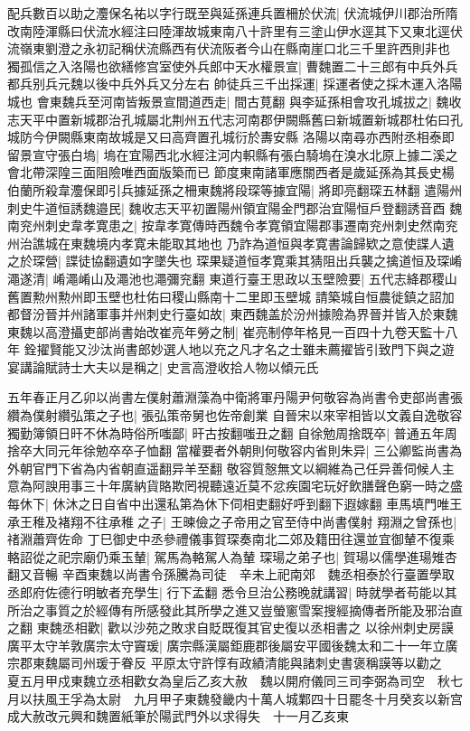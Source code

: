 配兵數百以助之灋保名祐以字行既至與延孫連兵置柵於伏流|{
	伏流城伊川郡治所隋改南陸渾縣曰伏流水經注曰陸渾故城東南八十許里有三塗山伊水逕其下又東北逕伏流嶺東劉澄之永初記稱伏流縣西有伏流阪者今山在縣南崖口北三千里許西則非也}
獨孤信之入洛陽也欲繕修宫室使外兵郎中天水權景宣|{
	曹魏置二十三郎有中兵外兵都兵别兵元魏以後中兵外兵又分左右}
帥徒兵三千出採運|{
	採運者使之採木運入洛陽城也}
會東魏兵至河南皆叛景宣間道西走|{
	間古莧翻}
與李延孫相會攻孔城拔之|{
	魏收志天平中置新城郡治孔城屬北荆州五代志河南郡伊闕縣舊曰新城置新城郡杜佑曰孔城防今伊闕縣東南故城是又曰高齊置孔城衍於夀安縣}
洛陽以南尋亦西附丞相泰即留景宣守張白塢|{
	塢在宜陽西北水經注河内軹縣有張白騎塢在溴水北原上據二溪之會北帶深隍三面阻險唯西面版築而已}
節度東南諸軍應關西者是歲延孫為其長史楊伯蘭所殺韋灋保即引兵據延孫之柵東魏將段琛等據宜陽|{
	將即亮翻琛五林翻}
遣陽州刺史牛道恒誘魏邉民|{
	魏收志天平初置陽州領宜陽金門郡治宜陽恒戶登翻誘音酉}
魏南兖州刺史韋孝寛患之|{
	按韋孝寛傳時西魏令孝寛領宜陽郡事遷南兖州刺史然南兖州治譙城在東魏境内孝寛未能取其地也}
乃詐為道恒與孝寛書論歸欵之意使諜人遺之於琛營|{
	諜徒協翻遺如字墜失也}
琛果疑道恒孝寛乘其猜阻出兵襲之擒道恒及琛崤澠遂清|{
	崤澠崤山及澠池也澠彌兖翻}
東道行臺王思政以玉壁險要|{
	五代志絳郡稷山舊置勲州勲州即玉壁也杜佑曰稷山縣南十二里即玉壁城}
請築城自恒農徙鎮之詔加都督汾晉并州諸軍事并州刺史行臺如故|{
	東西魏盖於汾州據險為界晉并皆入於東魏}
東魏以高澄攝吏部尚書始改崔亮年勞之制|{
	崔亮制停年格見一百四十九卷天監十八年}
銓擢賢能又沙汰尚書郎妙選人地以充之凡才名之士雖未薦擢皆引致門下與之遊宴講論賦詩士大夫以是稱之|{
	史言高澄收拾人物以傾元氏}


五年春正月乙卯以尚書左僕射蕭淵藻為中衛將軍丹陽尹何敬容為尚書令吏部尚書張纘為僕射纘弘策之子也|{
	張弘策帝舅也佐帝創業}
自晉宋以來宰相皆以文義自逸敬容獨勤簿領日旰不休為時俗所嗤鄙|{
	旰古按翻嗤丑之翻}
自徐勉周捨既卒|{
	普通五年周捨卒大同元年徐勉卒卒子恤翻}
當權要者外朝則何敬容内省則朱异|{
	三公卿監尚書為外朝官門下省為内省朝直遥翻异羊至翻}
敬容質慤無文以綱維為己任异善伺候人主意為阿諛用事三十年廣納貨賂欺罔視聽遠近莫不忿疾園宅玩好飲膳聲色窮一時之盛每休下|{
	休沐之日自省中出還私第為休下伺相吏翻好呼到翻下遐嫁翻}
車馬填門唯王承王稚及褚翔不往承稚之子|{
	王暕儉之子帝用之官至侍中尚書僕射}
翔淵之曾孫也|{
	禇淵蕭齊佐命}
丁巳御史中丞參禮儀事賀琛奏南北二郊及籍田往還並宜御輦不復乘輅詔從之祀宗廟仍乘玉輦|{
	駕馬為輅駕人為輦}
琛瑒之弟子也|{
	賀瑒以儒學進瑒雉杏翻又音暢}
辛酉東魏以尚書令孫騰為司徒　辛未上祀南郊　魏丞相泰於行臺置學取丞郎府佐德行明敏者充學生|{
	行下孟翻}
悉令旦治公務晚就講習|{
	時就學者苟能以其所治之事質之於經傳有所感發此其所學之進又豈螢窻雪案搜經摘傳者所能及邪治直之翻}
東魏丞相歡|{
	歡以沙苑之敗求自貶既復其官史復以丞相書之}
以徐州刺史房謨廣平太守羊敦廣宗太守竇瑗|{
	廣宗縣漢屬鉅鹿郡後屬安平國後魏太和二十一年立廣宗郡東魏屬司州瑗于眷反}
平原太守許惇有政績清能與諸刺史書褒稱謨等以勸之　夏五月甲戍東魏立丞相歡女為皇后乙亥大赦　魏以開府儀同三司李弼為司空　秋七月以扶風王孚為太尉　九月甲子東魏發畿内十萬人城鄴四十日罷冬十月癸亥以新宫成大赦改元興和魏置紙筆於陽武門外以求得失　十一月乙亥東

